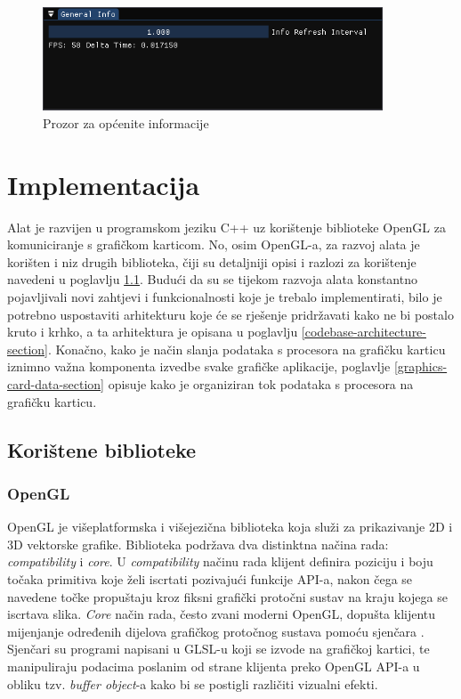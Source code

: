 \documentclass[times, utf8, diplomski]{fer}
\begin{document}
\begin{figure} [H]
	\centering
    \includegraphics[width=0.9\textwidth]{general_info.png}
    \caption{Prozor za općenite informacije}
    \label{fig:general-info}
\end{figure}

\chapter{Implementacija}

Alat je razvijen u programskom jeziku C++ uz korištenje biblioteke OpenGL za komuniciranje s grafičkom karticom. No, osim OpenGL-a, za razvoj alata je korišten i niz drugih biblioteka, čiji su detaljniji opisi i razlozi za korištenje navedeni u poglavlju \ref{libraries-section}. Budući da su se tijekom razvoja alata konstantno pojavljivali novi zahtjevi i funkcionalnosti koje je trebalo implementirati, bilo je potrebno uspostaviti arhitekturu koje će se rješenje pridržavati kako ne bi postalo kruto i krhko, a ta arhitektura je opisana u poglavlju \ref{codebase-architecture-section}. Konačno, kako je način slanja podataka s procesora na grafičku karticu iznimno važna komponenta izvedbe svake grafičke aplikacije, poglavlje \ref{graphics-card-data-section} opisuje kako je organiziran tok podataka s procesora na grafičku karticu.

\section{Korištene biblioteke} \label{libraries-section}

\subsection{OpenGL}

OpenGL \citep{opengl} je višeplatformska i višejezična biblioteka koja služi za prikazivanje 2D i 3D vektorske grafike. Biblioteka podržava dva distinktna načina rada: \textit{compatibility} i \textit{core}. U \textit{compatibility} načinu rada klijent definira poziciju i boju točaka primitiva koje želi iscrtati pozivajući funkcije API-a, nakon čega se navedene točke propuštaju kroz fiksni grafički protočni sustav na kraju kojega se iscrtava slika. \textit{Core} način rada, često zvani moderni OpenGL, dopušta klijentu mijenjanje određenih dijelova grafičkog protočnog sustava pomoću sjenčara . Sjenčari su programi napisani u GLSL-u  koji se izvode na grafičkoj kartici, te manipuliraju podacima poslanim od strane klijenta preko OpenGL API-a u obliku tzv. \textit{buffer object}-a kako bi se postigli različiti vizualni efekti.\\
\end{document}
